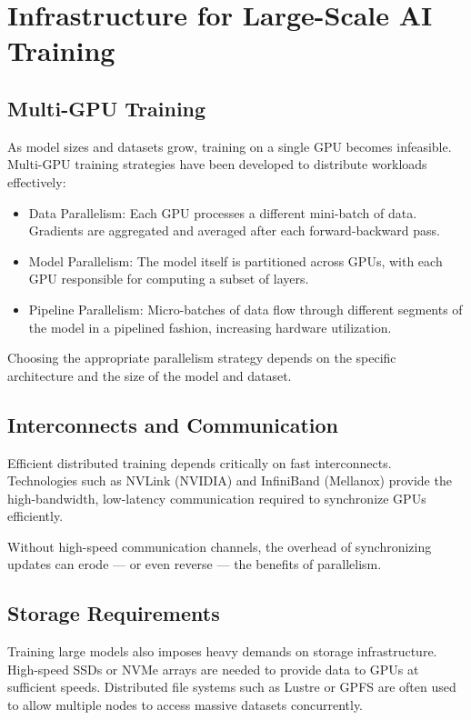 \documentclass[openany]{book}
\begin{document}
\section{Infrastructure for Large-Scale AI Training}

\subsection{Multi-GPU Training}
As model sizes and datasets grow, training on a single GPU becomes infeasible. 
Multi-GPU training strategies have been developed to distribute workloads 
effectively:

\begin{itemize}
    \item Data Parallelism: Each GPU processes a different mini-batch of data. 
    Gradients are aggregated and averaged after each forward-backward pass.
    \item Model Parallelism: The model itself is partitioned across GPUs, with 
    each GPU responsible for computing a subset of layers.
    \item Pipeline Parallelism: Micro-batches of data flow through different 
    segments of the model in a pipelined fashion, increasing hardware 
    utilization.
\end{itemize}

Choosing the appropriate parallelism strategy depends on the specific 
architecture and the size of the model and dataset.

\subsection{Interconnects and Communication}
Efficient distributed training depends critically on fast interconnects. 
Technologies such as NVLink (NVIDIA) and InfiniBand (Mellanox) provide the 
high-bandwidth, low-latency communication required to synchronize GPUs 
efficiently.

Without high-speed communication channels, the overhead of synchronizing updates 
can erode — or even reverse — the benefits of parallelism.

\subsection{Storage Requirements}
Training large models also imposes heavy demands on storage infrastructure. 
High-speed SSDs or NVMe arrays are needed to provide data to GPUs at sufficient 
speeds. Distributed file systems such as Lustre or GPFS are often used to allow 
multiple nodes to access massive datasets concurrently.
\end{document}
